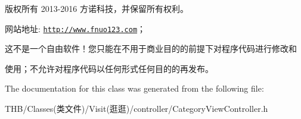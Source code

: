 版权所有 2013-\/2016 方诺科技，并保留所有权利。

网站地址\+: \href{http://www.fnuo123.com}{\tt http\+://www.\+fnuo123.\+com}； 



这不是一个自由软件！您只能在不用于商业目的的前提下对程序代码进行修改和

使用；不允许对程序代码以任何形式任何目的的再发布。 

 

The documentation for this class was generated from the following file\+:\begin{DoxyCompactItemize}
\item 
T\+H\+B/\+Classes(类文件)/\+Visit(逛逛)/controller/Category\+View\+Controller.\+h\end{DoxyCompactItemize}

